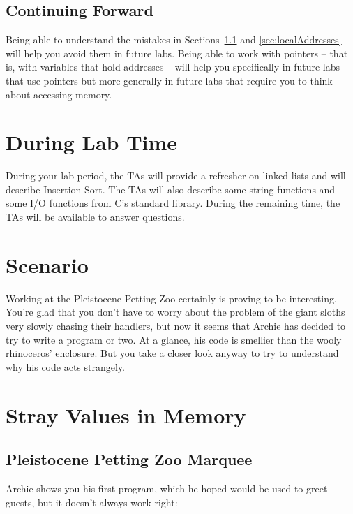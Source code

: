 \subsection*{Continuing Forward}

Being able to understand the mistakes in
Sections~\ref{sec:uninitializedVariables} and \ref{sec:localAddresses} will
help you avoid them in future labs. Being able to work with pointers -- that
is, with variables that hold addresses -- will help you specifically in future
labs that use pointers but more generally in future labs that require you to
think about accessing memory.

\section*{During Lab Time}

During your lab period, the TAs will provide a refresher on linked lists and
will describe Insertion Sort. The TAs will also describe some string functions
and some I/O functions from C's standard library. During the remaining time,
the TAs will be available to answer questions.

\softwareengineeringfrontmatter

\section*{Scenario}

Working at the Pleistocene Petting Zoo certainly is proving to be interesting.
You're glad that you don't have to worry about the problem of the giant sloths
very slowly chasing their handlers, but now it seems that Archie has decided to
try to write a program or two. At a glance, his code is smellier than the wooly
rhinoceros' enclosure. But you take a closer look anyway to try to understand
why his code acts strangely.

\section{Stray Values in Memory}

\subsection{Pleistocene Petting Zoo Marquee}\label{sec:uninitializedVariables}

Archie shows you his first program, which he hoped would be used to greet
guests, but it doesn't always work right:


